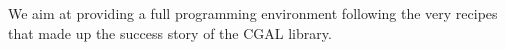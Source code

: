 %
%
%
%
We aim at providing  a full programming environment
%
following the very recipes that made up the success story of the CGAL
library.  


